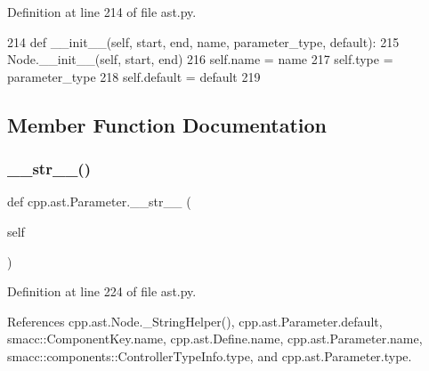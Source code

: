 Definition at line 214 of file ast.\+py.


\begin{DoxyCode}
214     \textcolor{keyword}{def }\_\_init\_\_(self, start, end, name, parameter\_type, default):
215         Node.\_\_init\_\_(self, start, end)
216         self.name = name
217         self.type = parameter\_type
218         self.default = default
219 
\end{DoxyCode}


\subsection{Member Function Documentation}
\mbox{\label{classcpp_1_1ast_1_1Parameter_aabfbabb3c744a0da4a012ceb4299947a}} 
\subsubsection{\texorpdfstring{\+\_\+\+\_\+str\+\_\+\+\_\+()}{\_\_str\_\_()}}
{\footnotesize\ttfamily def cpp.\+ast.\+Parameter.\+\_\+\+\_\+str\+\_\+\+\_\+ (\begin{DoxyParamCaption}\item[{}]{self }\end{DoxyParamCaption})}



Definition at line 224 of file ast.\+py.



References cpp.\+ast.\+Node.\+\_\+\+String\+Helper(), cpp.\+ast.\+Parameter.\+default, smacc\+::\+Component\+Key.\+name, cpp.\+ast.\+Define.\+name, cpp.\+ast.\+Parameter.\+name, smacc\+::components\+::\+Controller\+Type\+Info.\+type, and cpp.\+ast.\+Parameter.\+type.


